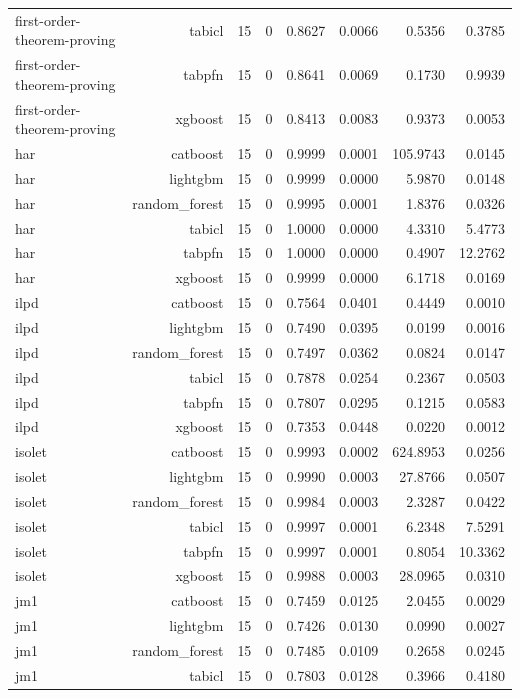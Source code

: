 \begin{table}[htbp]
\begin{tabular}{lrrrrrrr}
first-order-theorem-proving & tabicl & 15 & 0 & 0.8627 & 0.0066 & 0.5356 & 0.3785 \\
first-order-theorem-proving & tabpfn & 15 & 0 & 0.8641 & 0.0069 & 0.1730 & 0.9939 \\
first-order-theorem-proving & xgboost & 15 & 0 & 0.8413 & 0.0083 & 0.9373 & 0.0053 \\
har & catboost & 15 & 0 & 0.9999 & 0.0001 & 105.9743 & 0.0145 \\
har & lightgbm & 15 & 0 & 0.9999 & 0.0000 & 5.9870 & 0.0148 \\
har & random\_forest & 15 & 0 & 0.9995 & 0.0001 & 1.8376 & 0.0326 \\
har & tabicl & 15 & 0 & 1.0000 & 0.0000 & 4.3310 & 5.4773 \\
har & tabpfn & 15 & 0 & 1.0000 & 0.0000 & 0.4907 & 12.2762 \\
har & xgboost & 15 & 0 & 0.9999 & 0.0000 & 6.1718 & 0.0169 \\
ilpd & catboost & 15 & 0 & 0.7564 & 0.0401 & 0.4449 & 0.0010 \\
ilpd & lightgbm & 15 & 0 & 0.7490 & 0.0395 & 0.0199 & 0.0016 \\
ilpd & random\_forest & 15 & 0 & 0.7497 & 0.0362 & 0.0824 & 0.0147 \\
ilpd & tabicl & 15 & 0 & 0.7878 & 0.0254 & 0.2367 & 0.0503 \\
ilpd & tabpfn & 15 & 0 & 0.7807 & 0.0295 & 0.1215 & 0.0583 \\
ilpd & xgboost & 15 & 0 & 0.7353 & 0.0448 & 0.0220 & 0.0012 \\
isolet & catboost & 15 & 0 & 0.9993 & 0.0002 & 624.8953 & 0.0256 \\
isolet & lightgbm & 15 & 0 & 0.9990 & 0.0003 & 27.8766 & 0.0507 \\
isolet & random\_forest & 15 & 0 & 0.9984 & 0.0003 & 2.3287 & 0.0422 \\
isolet & tabicl & 15 & 0 & 0.9997 & 0.0001 & 6.2348 & 7.5291 \\
isolet & tabpfn & 15 & 0 & 0.9997 & 0.0001 & 0.8054 & 10.3362 \\
isolet & xgboost & 15 & 0 & 0.9988 & 0.0003 & 28.0965 & 0.0310 \\
jm1 & catboost & 15 & 0 & 0.7459 & 0.0125 & 2.0455 & 0.0029 \\
jm1 & lightgbm & 15 & 0 & 0.7426 & 0.0130 & 0.0990 & 0.0027 \\
jm1 & random\_forest & 15 & 0 & 0.7485 & 0.0109 & 0.2658 & 0.0245 \\
jm1 & tabicl & 15 & 0 & 0.7803 & 0.0128 & 0.3966 & 0.4180 \\

\end{tabular}
\end{table}
